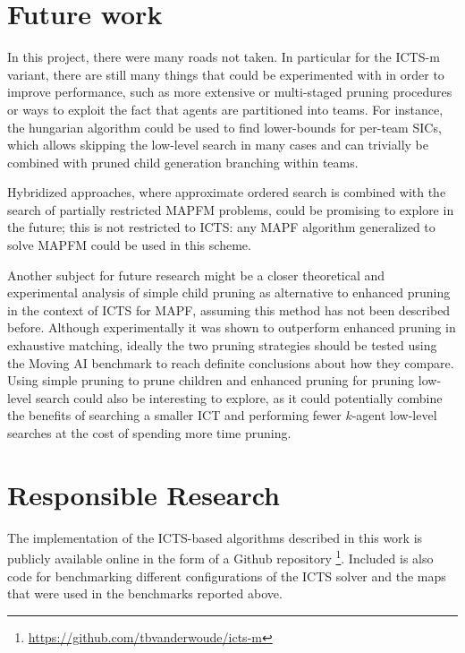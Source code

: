 \documentclass[english,10pt]{article}
\begin{document}
	\section{Future work}
	In this project, there were many roads not taken. In particular for the ICTS-m variant, there are still many things that could be experimented with in order to improve performance, such as more extensive or multi-staged pruning procedures or ways to exploit the fact that agents are partitioned into teams. For instance, the hungarian algorithm could be used to find lower-bounds for per-team SICs, which allows skipping the low-level search in many cases and can trivially be combined with pruned child generation branching within teams. 
	
	Hybridized approaches, where approximate ordered search is combined with the search of partially restricted MAPFM problems, could be promising to explore in the future; this is not restricted to ICTS: any MAPF algorithm generalized to solve MAPFM could be used in this scheme.

	Another subject for future research might be a closer theoretical and experimental analysis of simple child pruning as alternative to enhanced pruning in the context of ICTS for MAPF, assuming this method has not been described before. Although experimentally it was shown to outperform enhanced pruning in exhaustive matching, ideally the two pruning strategies should be tested using the Moving AI benchmark \cite{sturtevant2012} to reach definite conclusions about how they compare. Using simple pruning to prune children and enhanced pruning for pruning low-level search could also be interesting to explore, as it could potentially combine the benefits of searching a smaller ICT and performing fewer $k$-agent low-level searches at the cost of spending more time pruning.
	\section{Responsible Research}
	The implementation of the ICTS-based algorithms described in this work is publicly available online in the form of a Github repository \footnote{\url{https://github.com/tbvanderwoude/icts-m}}. Included is also code for benchmarking different configurations of the ICTS solver and the maps that were used in the benchmarks reported above.
	
\end{document}
